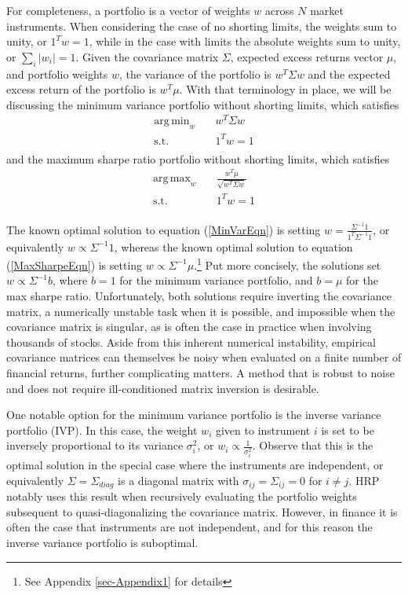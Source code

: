 \documentclass[10pt,twoside,titlepage]{article}   %
\DeclareMathOperator*{\argmax}{arg\,max}
\DeclareMathOperator*{\argmin}{arg\,min}
\begin{document}
For completeness, a portfolio is a vector of weights $w$ across $N$ market instruments. 
When considering the case of no shorting limits, the weights sum to unity, or $1^Tw=1$, 
while in the case with limits the absolute weights sum to unity, or $\sum_i |w_i|=1$. 
Given the covariance matrix $\Sigma$, expected excess returns vector $\mu$, and portfolio weights $w$,
the variance of the portfolio is $w^T \Sigma w$ and the expected excess return of the portfolio is $w^T \mu$.
With that terminology in place, we will be discussing the minimum variance portfolio without shorting limits, which satisfies
\begin{equation}\label{MinVarEqn}
\begin{aligned}
\argmin_{w} \quad & w^T \Sigma w \\
\textrm{s.t.} \quad & 1^T w = 1\\
\end{aligned}
\end{equation} 
and the maximum sharpe ratio portfolio without shorting limits, which satisfies
\begin{equation}\label{MaxSharpeEqn}
\begin{aligned}
\argmax_{w} \quad & \frac{w^T \mu}{ \sqrt{ w^T \Sigma w } } \\
\textrm{s.t.} \quad & 1^T w = 1\\
\end{aligned}
\end{equation}

The known optimal solution to equation (\ref{MinVarEqn}) is setting $w=\frac{\Sigma^{-1} 1}{1^T\Sigma^{-1} 1}$, or equivalently $w\propto \Sigma^{-1} 1$, 
whereas the known optimal solution to equation (\ref{MaxSharpeEqn}) is setting $w\propto \Sigma^{-1} \mu$.\footnote{See Appendix \ref{sec-Appendix1} for details} 
Put more concisely, the solutions set $w\propto \Sigma^{-1} b$, where $b=1$ for the minimum variance portfolio, and $b=\mu$ for the max sharpe ratio. 
Unfortunately, both solutions require inverting the covariance matrix, a numerically unstable task when it is possible, 
and impossible when the covariance matrix is singular, as is often the case in practice when involving thousands of stocks. 
Aside from this inherent numerical instability, empirical covariance matrices can themselves be noisy 
when evaluated on a finite number of financial returns, further complicating matters. 
A method that is robust to noise and does not require ill-conditioned matrix inversion is desirable.
 
One notable option for the minimum variance portfolio is the inverse variance portfolio (IVP). 
In this case, the weight $w_i$ given to instrument $i$ is set to be inversely proportional to its variance $\sigma_i^2$, or $w_i \propto \frac{1}{\sigma_i^2}$. 
Observe that this is the optimal solution in the special case where the instruments are independent, 
or equivalently $\Sigma = \Sigma_{diag}$ is a diagonal matrix with $\sigma_{ij} = \Sigma_{ij} = 0$ for $i \neq j$. 
HRP notably uses this result when recursively evaluating the portfolio weights subsequent to quasi-diagonalizing the covariance matrix. 
However, in finance it is often the case that instruments are not independent, and for this reason the inverse variance portfolio is suboptimal.
\end{document}
